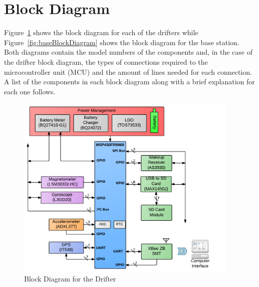 \section{Block Diagram}

Figure~\ref{fig:drifterBlockDiagram} shows the block diagram for each of the drifters while Figure~\ref{fig:baseBlockDiagram} shows the block diagram for the base station.  Both diagrams contain the model numbers of the components and, in the case of the drifter block diagram, the types of connections required to the microcontroller unit (MCU) and the amount of lines needed for each connection.  A list of the components in each block diagram along with a brief explanation for each one follows.

\begin{figure}[ht]
	\centering
	\includegraphics[width=0.95\textwidth]{img/blockDiagram}
	\caption{Block Diagram for the Drifter \label{fig:drifterBlockDiagram}}
\end{figure}


